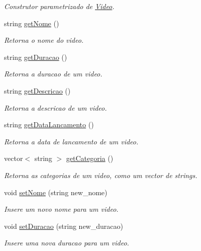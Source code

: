 \begin{DoxyCompactItemize}
\begin{DoxyCompactList}\small\item\em Construtor parametrizado de \hyperlink{classVideo}{Video}. \end{DoxyCompactList}\item 
string \hyperlink{classVideo_ac3035c8de729710bc0f216944f52108e}{get\+Nome} ()
\begin{DoxyCompactList}\small\item\em Retorna o nome do video. \end{DoxyCompactList}\item 
string \hyperlink{classVideo_a4bc57b6ca1b388bf6e6069fc47fdad2e}{get\+Duracao} ()
\begin{DoxyCompactList}\small\item\em Retorna a duracao de um video. \end{DoxyCompactList}\item 
string \hyperlink{classVideo_a7c849d776eec017cb3d8a537fc06d39d}{get\+Descricao} ()
\begin{DoxyCompactList}\small\item\em Retorna a descricao de um video. \end{DoxyCompactList}\item 
string \hyperlink{classVideo_a8f9ffc81e5501047af1ce4d11510f30c}{get\+Data\+Lancamento} ()
\begin{DoxyCompactList}\small\item\em Retorna a data de lancamento de um video. \end{DoxyCompactList}\item 
vector$<$ string $>$ \hyperlink{classVideo_a89e9a95b481f991696120c50942bdcc1}{get\+Categoria} ()
\begin{DoxyCompactList}\small\item\em Retorna as categorias de um video, como um vector de strings. \end{DoxyCompactList}\item 
void \hyperlink{classVideo_a575297aa1da19ad764903394ffaad070}{set\+Nome} (string new\+\_\+nome)
\begin{DoxyCompactList}\small\item\em Insere um novo nome para um video. \end{DoxyCompactList}\item 
void \hyperlink{classVideo_a8f962ae1a15512ae867920ede1923873}{set\+Duracao} (string new\+\_\+duracao)
\begin{DoxyCompactList}\small\item\em Insere uma nova duracao para um video. \end{DoxyCompactList}\item 

\end{DoxyCompactItemize}
